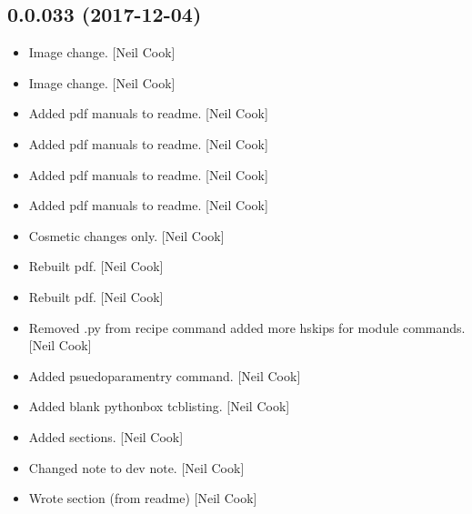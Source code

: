 \documentclass[a4paper,10pt,english]{report}
\begin{document}
\subsection{0.0.033 (2017-12-04)}
\label{\detokenize{misc/changelog:id517}}\begin{itemize}
\item {} 
Image change. {[}Neil Cook{]}

\item {} 
Image change. {[}Neil Cook{]}

\item {} 
Added pdf manuals to readme. {[}Neil Cook{]}

\item {} 
Added pdf manuals to readme. {[}Neil Cook{]}

\item {} 
Added pdf manuals to readme. {[}Neil Cook{]}

\item {} 
Added pdf manuals to readme. {[}Neil Cook{]}

\item {} 
Cosmetic changes only. {[}Neil Cook{]}

\item {} 
Rebuilt pdf. {[}Neil Cook{]}

\item {} 
Rebuilt pdf. {[}Neil Cook{]}

\item {} 
Removed .py from recipe command added more hskips for module commands.
{[}Neil Cook{]}

\item {} 
Added psuedoparamentry command. {[}Neil Cook{]}

\item {} 
Added blank pythonbox tcblisting. {[}Neil Cook{]}

\item {} 
Added sections. {[}Neil Cook{]}

\item {} 
Changed note to dev note. {[}Neil Cook{]}

\item {} 
Wrote section (from readme) {[}Neil Cook{]}

\end{itemize}
\end{document}

